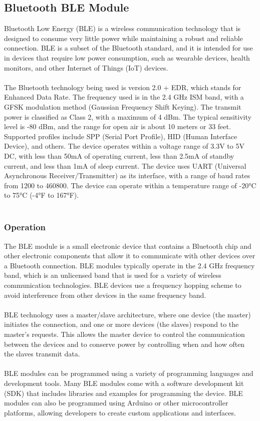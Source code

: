 \documentclass[12pt]{article}
\begin{document}
\subsection{Bluetooth BLE Module}
Bluetooth Low Energy (BLE) is a wireless communication technology that is designed to consume very little power while maintaining a robust and reliable connection. BLE is a subset of the Bluetooth standard, and it is intended for use in devices that require low power consumption, such as wearable devices, health monitors, and other Internet of Things (IoT) devices.
\\
\\
The Bluetooth technology being used is version 2.0 + EDR, which stands for Enhanced Data Rate. The frequency used is in the 2.4 GHz ISM band, with a GFSK modulation method (Gaussian Frequency Shift Keying). The transmit power is classified as Class 2, with a maximum of 4 dBm. The typical sensitivity level is -80 dBm, and the range for open air is about 10 meters or 33 feet. Supported profiles include SPP (Serial Port Profile), HID (Human Interface Device), and others. The device operates within a voltage range of 3.3V to 5V DC, with less than 50mA of operating current, less than 2.5mA of standby current, and less than 1mA of sleep current. The device uses UART (Universal Asynchronous Receiver/Transmitter) as its interface, with a range of baud rates from 1200 to 460800. The device can operate within a temperature range of -20°C to 75°C (-4°F to 167°F).
\\
\\
\subsubsection{Operation}
The BLE module is a small electronic device that contains a Bluetooth chip and other electronic components that allow it to communicate with other devices over a Bluetooth connection. BLE modules typically operate in the 2.4 GHz frequency band, which is an unlicensed band that is used for a variety of wireless communication technologies. BLE devices use a frequency hopping scheme to avoid interference from other devices in the same frequency band.
\\
\\

BLE technology uses a master/slave architecture, where one device (the master) initiates the connection, and one or more devices (the slaves) respond to the master's requests. This allows the master device to control the communication between the devices and to conserve power by controlling when and how often the slaves transmit data.
\\
\\
BLE modules can be programmed using a variety of programming languages and development tools. Many BLE modules come with a software development kit (SDK) that includes libraries and examples for programming the device. BLE modules can also be programmed using Arduino or other microcontroller platforms, allowing developers to create custom applications and interfaces.
\\
\\
\end{document}
